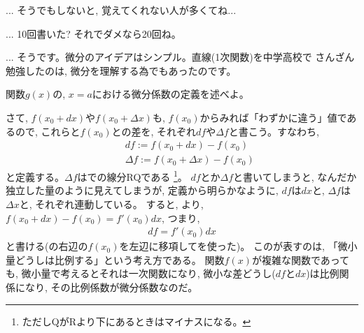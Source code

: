 \begin{faq}{\small{}
... そうでもしないと, 覚えてくれない人が多くてね...}\end{faq}

\begin{faq}{\small{}
... 10回書いた? それでダメなら20回ね。}\end{faq}

\begin{faq}{\small{}
 ... そうです。微分のアイデアはシンプル。直線(1次関数)を中学高校で
さんざん勉強したのは, 微分を理解する為でもあったのです。}\end{faq}

\begin{q}\label{q:diff_def0} 関数$g(x)$の, $x=a$における微分係数の定義を述べよ。\end{q}


さて, $f(x_0+dx)$や$f(x_0+\Delta x)$も, $f(x_0)$からみれば「わずかに違う」値であるので, 
これらと$f(x_0)$との差を, それぞれ$df$や$\Delta f$と書こう。すなわち, 
\begin{eqnarray}
&&df:=f(x_0+dx)-f(x_0)\label{eq:diff_def_df}\\
&&\Delta f:=f(x_0+\Delta x)-f(x_0)
\end{eqnarray}
と定義する。$\Delta f$はでの線分RQである
\footnote{ただしQがRより下にあるときはマイナスになる。}。
$df$とか$\Delta f$と書いてしまうと, なんだか独立した量のように見えてしまうが, 
定義から明らかなように, $df$は$dx$と, $\Delta f$は$\Delta x$と, それぞれ連動している。
すると, より, $f(x_0+dx)-f(x_0)=f'(x_0)dx$, つまり, 
\begin{eqnarray}
df=f'(x_0)dx\label{eq:define_dif001}
\end{eqnarray}
と書ける(の右辺の$f(x_0)$を左辺に移項してを使った)。
このが表すのは, 「微小量どうしは比例する」という考え方である。
関数$f(x)$が複雑な関数であっても, 微小量で考えるとそれは一次関数になり, 
微小な差どうし($df$と$dx$)は比例関係になり, その比例係数が微分係数なのだ。

